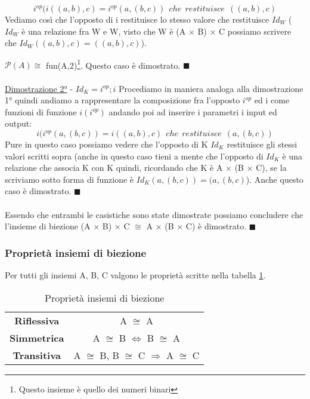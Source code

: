 \begin{example}
\begin{demostration}
\begin{equation}
                    i^{op}(i((a,b),c) = i^{op}(a, (b,c)) \: \: che \: \: restituisce \: \: ((a,b),c)
                \end{equation}
                Vediamo così che l'opposto di i restituisce lo stesso valore che restituisce $Id_W$ ($Id_W$ è una relazione fra W e W, visto che W è (A $\times$ B) $\times$ C possiamo scrivere che $Id_W((a,b),c) = ((a, b),c)$).
                \item $\mathcal{P}(A) \cong$ fun(A,2)\footnote{Questo insieme è quello dei numeri binari}. Questo caso è dimostrato. $\blacksquare$\\ \\
                \underline{Dimostrazione 2°} - $Id_K = i^{op};i$
                Procediamo in maniera analoga alla dimostrazione 1° quindi andiamo a rappresentare la composizione fra l'opposto $i^{op}$ ed i come funzioni di funzione $i(i^{op})$ andando poi ad inserire i parametri i input ed output:
                \begin{equation}
                    i(i^{op}(a,(b,c)) = i((a,b),c) \: \: che \: \: restituisce \: \: (a, (b,c))
                \end{equation}
                Pure in questo caso possiamo vedere che l'opposto di K $Id_K$ restituisce gli stessi valori scritti sopra (anche in questo caso tieni a mente che l'opposto di $Id_K$ è una relazione che associa K con K quindi, ricordando che K è A $\times$ (B $\times$ C), se la scriviamo sotto forma di funzione è $Id_K(a,(b,c)) = (a,(b,c)$). Anche questo caso è dimostrato. $\blacksquare$\\ \\
                Essendo che entrambi le casistiche sono state dimostrate possiamo concludere che l'insieme di biezione (A $\times$ B) $\times$ C $\cong$ A $\times$ (B $\times$ C) è dimostrato. $\blacksquare$
        \end{demostration}
\end{example}

\subsubsection{Proprietà insiemi di biezione}
Per tutti gli insiemi A, B, C valgono le proprietà scritte nella tabella \ref{tab:proprietà-insiemi-biezione}.
\begin{table}[h!]
    \centering
    \setlength{\tabcolsep}{8pt}
    \renewcommand{\arraystretch}{2}
    \begin{tabular}{|c|c|}
    \hline
        \textbf{Riflessiva} & A $\cong$ A  \\
        \textbf{Simmetrica} & A $\cong$ B $\Longleftrightarrow$ B $\cong$ A \\
        \textbf{Transitiva} & A $\cong$ B, B $\cong$ C $\Longrightarrow$ A $\cong$ C \\ \hline
    \end{tabular}
    \caption{Proprietà insiemi di biezione}
    \label{tab:proprietà-insiemi-biezione}
\end{table}

